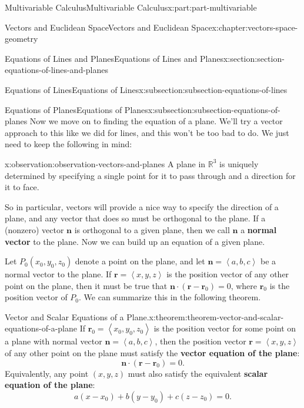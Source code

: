 \documentclass[twoside,10pt,]{tufte-book}
\newcommand{\terminology}[1]{\textbf{#1}}
\numberwithin{equation}{part}
\newcommand{\RR}{\mathbb{R}}
\newcommand{\dotprod}[1]{\left\langle #1 \right\rangle}
\begin{document}
\begin{partptx}{Multivariable Calculus}{}{Multivariable Calculus}{}{}{x:part:part-multivariable}
\begin{chapterptx}{Vectors and Euclidean Space}{}{Vectors and Euclidean Space}{}{}{x:chapter:vectors-space-geometry}
\begin{sectionptx}{Equations of Lines and Planes}{}{Equations of Lines and Planes}{}{}{x:section:section-equations-of-lines-and-planes}
\begin{subsectionptx}{Equations of Lines}{}{Equations of Lines}{}{}{x:subsection:subsection-equations-of-lines}
\end{subsectionptx}
%
%
\typeout{************************************************}
\typeout{************************************************}
%
\begin{subsectionptx}{Equations of Planes}{}{Equations of Planes}{}{}{x:subsection:subsection-equations-of-planes}
Now we move on to finding the equation of a plane. We'll try a vector approach to this like we did for lines, and this won't be too bad to do. We just need to keep the following in mind:%
\begin{observation}{}{x:observation:observation-vectors-and-planes}%
A plane in \(\RR^{3}\) is uniquely determined by specifying a single point for it to pass through and a direction for it to face.%
\end{observation}
So in particular, vectors will provide a nice way to specify the direction of a plane, and any vector that does so must be orthogonal to the plane. If a (nonzero) vector \(\mathbf{n}\) is orthogonal to a given plane, then we call \(\mathbf{n}\) a \terminology{normal vector} to the plane. Now we can build up an equation of a given plane.%
\par
Let \(P_{0}(x_{0},y_{0},z_{0})\) denote a point on the plane, and let \(\mathbf{n} = \dotprod{a,b,c}\) be a normal vector to the plane. If \(\mathbf{r}=\dotprod{x,y,z}\) is the position vector of any other point on the plane, then it must be true that \(\mathbf{n}\cdot(\mathbf{r}-\mathbf{r}_{0}) = 0\), where \(\mathbf{r}_{0}\) is the position vector of \(P_{0}\). We can summarize this in the following theorem.%
\begin{theorem}{Vector and Scalar Equations of a Plane.}{}{x:theorem:theorem-vector-and-scalar-equations-of-a-plane}%
%
If \(\mathbf{r}_{0} = \dotprod{x_{0},y_{0},z_{0}}\) is the position vector for some point on a plane with normal vector \(\mathbf{n} = \dotprod{a,b,c}\), then the position vector \(\mathbf{r} = \dotprod{x,y,z}\) of any other point on the plane must satisfy the \terminology{vector equation of the plane}:%
%
\begin{equation*}
\mathbf{n}\cdot(\mathbf{r}-\mathbf{r}_{0}) = 0.
\end{equation*}
Equivalently, any point \((x,y,z)\) must also satisfy the equivalent \terminology{scalar equation of the plane}:%
%
\begin{equation*}
a(x-x_{0})+b(y-y_{0})+c(z-z_{0}) = 0.
\end{equation*}

\end{theorem}
\end{subsectionptx}
\end{sectionptx}
\end{chapterptx}
\end{partptx}
\end{document}
